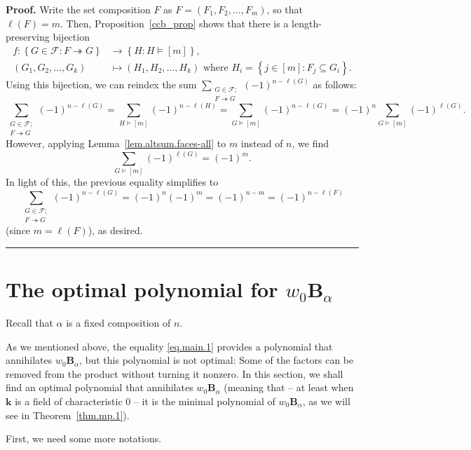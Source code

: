 \documentclass[12pt]{article}
\theoremstyle{definition}%
\theoremstyle{definition}%
\theoremstyle{remark}%
\newcommand{\tup}[1]{\left( #1 \right)}
\newcommand{\interval}[1]{\left[ #1 \right]} %
\newcommand{\set}[1]{\left\{ #1 \right\}}
\newcommand{\QQ}{\mathbb{Q}}
\newcommand{\kk}{\mathbf{k}}
\newcommand{\BBa}{\mathbf{B}_{\alpha}}
\newcommand{\CF}{\mathcal{F}}
\newcommand{\wo}{w_0} %
\newcommand{\con}{\twoheadrightarrow} %
\newenvironment{proof}[1][Proof]{\noindent\textbf{#1.} }{\ \rule{0.5em}{0.5em}}
\begin{document}
\begin{proof}
Write the set composition $F$ as $F = \tup{F_1, F_2, \ldots, F_m}$,
so that $\ell\tup{F} = m$.
Then,
Proposition~\ref{ccb_prop}
shows that there is a length-preserving bijection
\begin{align*}
f : \set{G\in\CF : F\con G}   &  \to 
\set{H : H\models \interval{m} }  ,\\
\tup{G_1, G_2, \ldots, G_k} &\mapsto \tup{H_1, H_2, \ldots, H_k}
            \text{ where } H_{i} = \set{j \in \interval{m} : F_{j} \subseteq G_{i}}.
\end{align*}
Using this bijection, we can reindex the sum
$\sum\limits_{\substack{G\in \CF; \\F\con G}}
\tup{-1}^{n-\ell\tup{G}}$ as follows:
\[
\sum_{\substack{G\in\CF; \\F\con G}}
\tup{-1}^{n-\ell\tup{G} }
=\sum_{H\models \interval{m}  }
\tup{-1}^{n-\ell\tup{H} }
=\sum_{G\models \interval{m}  }
\tup{-1}^{n-\ell\tup{G} }
= \tup{-1}^n
\sum_{G\models\interval{m}  }
\tup{-1}^{\ell\tup{G} }.
\]
However, applying Lemma~\ref{lem.altsum.faces-all} to $m$
instead of $n$, we find
\[
\sum_{G\models\interval{m}  } \tup{-1}^{\ell\tup{G} }
=\tup{-1}^m.
\]
In light of this, the previous equality simplifies to
\[
\sum_{\substack{G\in\CF; \\F\con G}}
\tup{-1}^{n-\ell\tup{G} }
=\tup{-1}^{n} \tup{-1}^{m}
=\tup{-1}^{n-m}
=\tup{-1}^{n-\ell\tup{F} }
\]
(since $m = \ell\tup{F}$),
as desired.
\end{proof}

\section{\label{sec.shortpol}The optimal polynomial for $\wo \BBa$}

Recall that $\alpha$ is a fixed composition of $n$.

As we mentioned above, the equality \eqref{eq.main.1}
provides a polynomial that annihilates $\wo \BBa$,
but this polynomial is not optimal: Some of the
factors can be removed from the product without
turning it nonzero.
In this section, we shall find an optimal polynomial
that annihilates $\wo \BBa$
(meaning that -- at least when $\kk$ is a field of
characteristic $0$ -- it is the minimal polynomial
of $\wo \BBa$, as we will see in Theorem~\ref{thm.mp.1}).

First, we need some more notations.
\end{document}
